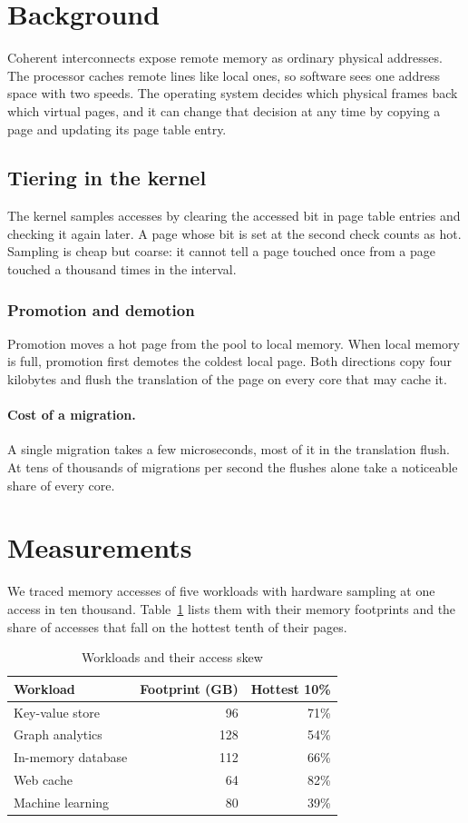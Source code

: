 \documentclass[sigconf,nonacm]{acmart}
\begin{document}
\section{Background}
Coherent interconnects expose remote memory as ordinary physical addresses. The processor caches
remote lines like local ones, so software sees one address space with two speeds. The operating
system decides which physical frames back which virtual pages, and it can change that decision
at any time by copying a page and updating its page table entry.

\subsection{Tiering in the kernel}
The kernel samples accesses by clearing the accessed bit in page table entries and checking it
again later. A page whose bit is set at the second check counts as hot. Sampling is cheap but
coarse: it cannot tell a page touched once from a page touched a thousand times in the interval.

\subsubsection{Promotion and demotion}
Promotion moves a hot page from the pool to local memory. When local memory is full, promotion
first demotes the coldest local page. Both directions copy four kilobytes and flush the
translation of the page on every core that may cache it.

\paragraph{Cost of a migration.} A single migration takes a few microseconds, most of it in the
translation flush. At tens of thousands of migrations per second the flushes alone take a
noticeable share of every core.

\section{Measurements}
We traced memory accesses of five workloads with hardware sampling at one access in ten
thousand. Table~\ref{tab:workloads} lists them with their memory footprints and the share of
accesses that fall on the hottest tenth of their pages.

\begin{table}[t]
\centering
\caption{Workloads and their access skew}
\label{tab:workloads}
\begin{tabular}{lrr}
\toprule
Workload & Footprint (GB) & Hottest 10\% \\
\midrule
Key-value store & 96 & 71\% \\
Graph analytics & 128 & 54\% \\
In-memory database & 112 & 66\% \\
Web cache & 64 & 82\% \\
Machine learning & 80 & 39\% \\
\bottomrule
\end{tabular}
\end{table}
\end{document}
